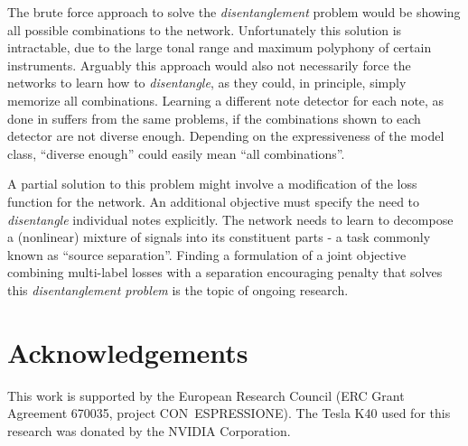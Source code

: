 The brute force approach to solve the \textit{disentanglement} problem would be showing all possible combinations to the network. Unfortunately this solution is intractable, due to the large tonal range and maximum polyphony of certain instruments. Arguably this approach would also not necessarily force the networks to learn how to \textit{disentangle}, as they could, in principle, simply memorize all combinations.
Learning a different note detector for each note, as done in \cite{Marolt_2004, Nam_Ngiam_Lee_Slaney_2011} suffers from the same problems, if the combinations shown to each detector are not diverse enough. Depending on the expressiveness of the model class, ``diverse enough'' could easily mean ``all combinations''.

A partial solution to this problem might involve a modification of the loss function for the network. An additional objective must specify the need to \textit{disentangle} individual notes explicitly. The network needs to learn to decompose a (nonlinear) mixture of signals into its constituent parts - a task commonly known as ``source separation''. Finding a formulation of a joint objective combining multi-label losses with a separation encouraging penalty that solves this \textit{disentanglement problem} is the topic of ongoing research.

\section*{Acknowledgements}
This work is supported by the European Research Council (ERC Grant Agreement 670035, project \mbox{CON ESPRESSIONE}). The Tesla K40 used for this research was donated by the NVIDIA Corporation.
